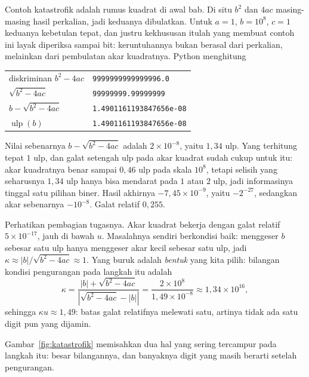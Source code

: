 Contoh katastrofik adalah rumus kuadrat di awal bab. Di situ $b^{2}$ dan $4ac$
masing-masing hasil perkalian, jadi keduanya dibulatkan. Untuk $a=1$, $b=10^{8}$,
$c=1$ keduanya kebetulan tepat, dan justru kekhususan itulah yang membuat contoh ini
layak diperiksa sampai bit: keruntuhannya bukan berasal dari perkalian, melainkan dari
pembulatan akar kuadratnya. Python menghitung

\begin{center}
\begin{tabular}{ll}
\hline
diskriminan $b^{2}-4ac$ & \texttt{9999999999999996.0} \\
$\sqrt{b^{2}-4ac}$ & \texttt{99999999.99999999} \\
$b-\sqrt{b^{2}-4ac}$ & \texttt{1.4901161193847656e-08} \\
$\operatorname{ulp}(b)$ & \texttt{1.4901161193847656e-08} \\
\hline
\end{tabular}
\end{center}

Nilai sebenarnya $b-\sqrt{b^{2}-4ac}$ adalah $2\times10^{-8}$, yaitu $1{,}34$ ulp.
Yang terhitung tepat $1$ ulp, dan galat setengah ulp pada akar kuadrat sudah cukup
untuk itu: akar kuadratnya benar sampai $0{,}46$ ulp pada skala $10^{8}$, tetapi
selisih yang seharusnya $1{,}34$ ulp hanya bisa mendarat pada $1$ atau $2$ ulp, jadi
informasinya tinggal satu pilihan biner. Hasil akhirnya $-7{,}45\times10^{-9}$, yaitu
$-2^{-27}$, sedangkan akar sebenarnya $-10^{-8}$. Galat relatif $0{,}255$.

Perhatikan pembagian tugasnya. Akar kuadrat bekerja dengan galat relatif
$5\times10^{-17}$, jauh di bawah $u$. Masalahnya sendiri berkondisi baik: menggeser
$b$ sebesar satu ulp hanya menggeser akar kecil sebesar satu ulp, jadi
$\kappa\approx|b|/\sqrt{b^{2}-4ac}\approx1$. Yang buruk adalah \emph{bentuk} yang kita
pilih: bilangan kondisi pengurangan pada langkah itu adalah
\[
  \kappa=\frac{|b|+\sqrt{b^{2}-4ac}}{\left|\sqrt{b^{2}-4ac}-|b|\right|}
  =\frac{2\times10^{8}}{1{,}49\times10^{-8}}\approx1{,}34\times10^{16},
\]
sehingga $\kappa u\approx1{,}49$: batas galat relatifnya melewati satu, artinya tidak
ada satu digit pun yang dijamin.

Gambar~\ref{fig:katastrofik} memisahkan dua hal yang sering tercampur pada langkah itu:
besar bilangannya, dan banyaknya digit yang masih berarti setelah pengurangan.

